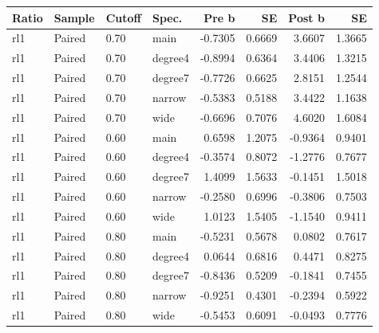 \begin{threeparttable}
\begin{tabular}{llllrrrr}
\toprule
Ratio & Sample & Cutoff & Spec. & Pre b & SE & Post b & SE \\
\midrule
rl1 & Paired & 0.70 & main & -0.7305 & 0.6669 & 3.6607 & 1.3665 \\
rl1 & Paired & 0.70 & degree4 & -0.8994 & 0.6364 & 3.4406 & 1.3215 \\
rl1 & Paired & 0.70 & degree7 & -0.7726 & 0.6625 & 2.8151 & 1.2544 \\
rl1 & Paired & 0.70 & narrow & -0.5383 & 0.5188 & 3.4422 & 1.1638 \\
rl1 & Paired & 0.70 & wide & -0.6696 & 0.7076 & 4.6020 & 1.6084 \\
rl1 & Paired & 0.60 & main & 0.6598 & 1.2075 & -0.9364 & 0.9401 \\
rl1 & Paired & 0.60 & degree4 & -0.3574 & 0.8072 & -1.2776 & 0.7677 \\
rl1 & Paired & 0.60 & degree7 & 1.4099 & 1.5633 & -0.1451 & 1.5018 \\
rl1 & Paired & 0.60 & narrow & -0.2580 & 0.6996 & -0.3806 & 0.7503 \\
rl1 & Paired & 0.60 & wide & 1.0123 & 1.5405 & -1.1540 & 0.9411 \\
rl1 & Paired & 0.80 & main & -0.5231 & 0.5678 & 0.0802 & 0.7617 \\
rl1 & Paired & 0.80 & degree4 & 0.0644 & 0.6816 & 0.4471 & 0.8275 \\
rl1 & Paired & 0.80 & degree7 & -0.8436 & 0.5209 & -0.1841 & 0.7455 \\
rl1 & Paired & 0.80 & narrow & -0.9251 & 0.4301 & -0.2394 & 0.5922 \\
rl1 & Paired & 0.80 & wide & -0.5453 & 0.6091 & -0.0493 & 0.7776 \\
\bottomrule
\end{tabular}
\end{threeparttable}
\par\medskip
